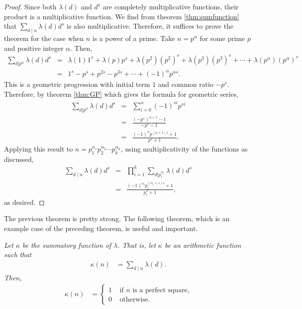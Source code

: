 \documentclass[12pt]{subfile}
\begin{document}
		\begin{proof}
			Since both $\lambda(d)$ and $d^s$ are completely multiplicative functions, their product is a multiplicative function. We find from theorem \ref{thm:sumfunction} that $\sum\limits_{d\mid n} \lambda(d) d^s$ is also multiplicative. Therefore, it suffices to prove the theorem for the case when $n$ is a power of a prime. Take $n=p^\alpha$ for some prime $p$ and positive integer $\alpha$. Then,
				\begin{eqnarray*}
					\sum_{d|p^\alpha} \lambda(d) d^s &=& \lambda(1) 1^s + \lambda(p) p^s + \lambda(p^2) \left(p^2\right)^s +\lambda(p^3) \left(p^3\right)^s+ \cdots + \lambda(p^\alpha) \left(p^\alpha \right)^s\\
											 &=& 1^s - p^s + p^{2s} - p^{3s} +\cdots + \left(-1\right)^{\alpha} p^{\alpha s}.
				\end{eqnarray*}
			This is a geometric progression with initial term $1$ and common ratio $-p^s$. Therefore, by theorem \ref{thm:GP} which gives the formula for geometric series,
				\begin{eqnarray*}
					\sum_{d|p^\alpha} \lambda(d) d^s &=& \sum_{i=0}^{\alpha} (-1)^{si}p^{si}\\
											 &= &\frac{\left(-p^s\right)^{\alpha + 1} -1}{-p^s -1}\\
											 &=& \frac{(-1)^\alpha p^{(\alpha + 1)s} + 1}{p^s + 1}.
				\end{eqnarray*}
			Applying this result to $n= p_1^{\alpha_1} p_2^{\alpha_2} \cdots p_k^{\alpha_k}$, using multiplicativity of the functions as discussed,
				\begin{eqnarray*}
					\sum_{d\mid n} \lambda(d) d^s  &=& \prod_{i=1}^{k}\sum_{d|p_i^{\alpha_i}} \lambda(d) d^s \\
										   &=& \frac{(-1)^{\alpha_i} p_i^{(\alpha_i+1)s} + 1}{p_i^s + 1},
				\end{eqnarray*}
			as desired.
		\end{proof}

	The previous theorem is pretty strong. The following theorem, which is an example case of the preceding theorem, is useful and important.

		\begin{theorem}\slshape \label{thm:liouville-sum-function}
			Let $\kappa$ be the summatory function of $\lambda$. That is, let $\kappa$ be an arithmetic function such that
				\begin{align*}
					\kappa (n) & = \sum_{d\mid n}\lambda(d).
				\end{align*}
			Then,
				\begin{align*}
					\kappa(n) & =
						\begin{cases}
							1&\text{ if }n\text{ is a perfect square,}\\
							0&\text{ otherwise.}
						\end{cases}
				\end{align*}
		\end{theorem}
\end{document}
